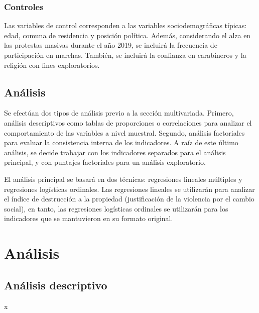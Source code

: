 \documentclass[12pt,twoside]{templates/facsothesis}
\begin{document}
\hypertarget{controles}{%
\subsection{Controles}\label{controles}}

Las variables de control corresponden a las variables sociodemográficas típicas: edad, comuna de residencia y posición política. Además, considerando el alza en las protestas masivas durante el año 2019, se incluirá la frecuencia de participación en marchas. También, se incluirá la confianza en carabineros y la religión con fines exploratorios.

\hypertarget{anuxe1lisis}{%
\section{Análisis}\label{anuxe1lisis}}

Se efectúan dos tipos de análisis previo a la sección multivariada. Primero, análisis descriptivos como tablas de proporciones o correlaciones para analizar el comportamiento de las variables a nivel muestral. Segundo, análisis factoriales para evaluar la consistencia interna de los indicadores. A raíz de este último análisis, se decide trabajar con los indicadores separados para el análisis principal, y con puntajes factoriales para un análisis exploratorio.

El análisis principal se basará en dos técnicas: regresiones lineales múltiples y regresiones logísticas ordinales. Las regresiones lineales se utilizarán para analizar el índice de destrucción a la propiedad (justificación de la violencia por el cambio social), en tanto, las regresiones logísticas ordinales se utilizarán para los indicadores que se mantuvieron en su formato original.

\pagebreak

\hypertarget{anuxe1lisis-1}{%
\chapter{Análisis}\label{anuxe1lisis-1}}

\hypertarget{anuxe1lisis-descriptivo}{%
\section{Análisis descriptivo}\label{anuxe1lisis-descriptivo}}

x
\end{document}
